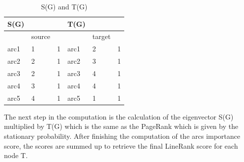 \begin{table}[t]
	\caption{S(G) and T(G)}
	\label{t1}
	\begin{center}
		\begin{tabular}{|l|l|l|l|l|l|}
			\hline
			S(G)	&	&	&T(G)	&	&	\\ \hline
				&source	&	&	&target	&	\\	\hline
			arc1	&1	&1	&arc1	&2	&1	\\ \hline
			arc2	&2	&1	&arc2	&3	&1	\\ \hline
			arc3	&2	&1	&arc3	&4	&1	\\ \hline
			arc4	&3	&1	&arc4	&4	&1	\\ \hline
			arc5	&4	&1	&arc5	&1	&1	\\ \hline
		\end{tabular}
	\end{center}
\end{table}

The next step in the computation is the calculation of the eigenvector S(G) multiplied by T(G) which is the same as the PageRank which is given by the stationary probability. After finishing the computation of the arcs importance score, the scores are summed up to retrieve the final LineRank score for each node T.